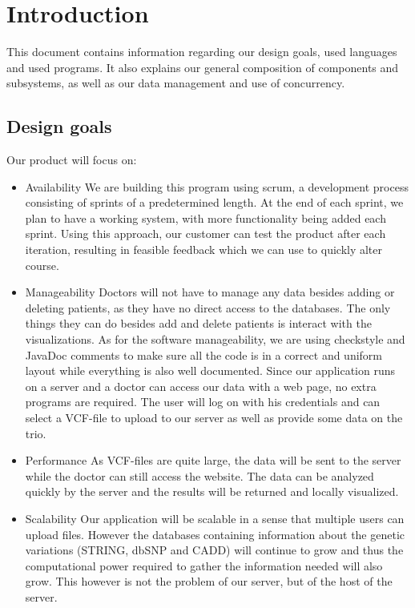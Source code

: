\section{Introduction}
	This document contains information regarding our design goals, used languages and used programs. It also explains our general composition of components and subsystems, as well as our data management and use of concurrency.
	\subsection{Design goals}
	Our product will focus on:
	\begin{itemize}
		\item Availability
			\subitem We are building this program using scrum, a development process consisting of sprints of a predetermined length. At the end of each sprint, we plan to have a working system, with more functionality being added each sprint. Using this approach, our customer can test the product after each iteration, resulting in feasible feedback which we can use to quickly alter course.
		\item Manageability
			\subitem Doctors will not have to manage any data besides adding or deleting patients, as they have no direct access to the databases. The only things they can do besides add and delete patients is interact with the visualizations. 
			\subitem As for the software manageability, we are using checkstyle and JavaDoc comments to make sure all the code is in a correct and uniform layout while everything is also well documented.
			\subitem Since our application runs on a server and a doctor can access our data with a web page, no extra programs are required. The user will log on with his credentials and can select a VCF-file to upload to our server as well as provide some data on the trio.
		\item Performance
			\subitem As VCF-files are quite large, the data will be sent to the server while the doctor can still access the website. The data can be analyzed quickly by the server and the results will be returned and locally visualized.
		\item Scalability
			\subitem Our application will be scalable in a sense that multiple users can upload files. However the databases containing information about the genetic variations (STRING, dbSNP and CADD) will continue to grow and thus the computational power required to gather the information needed will also grow. This however is not the problem of our server, but of the host of the server.

\end{itemize}
